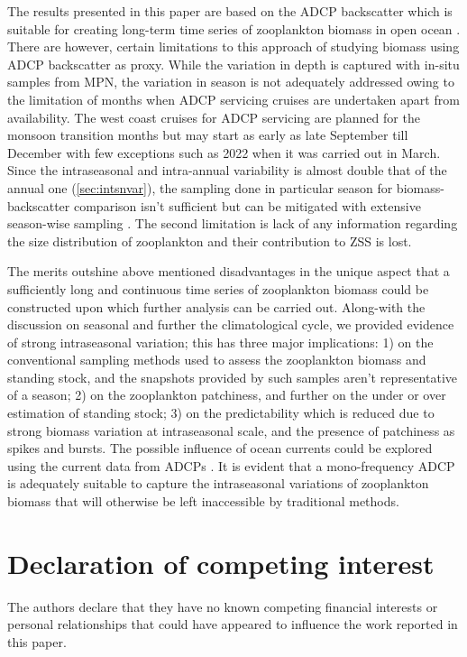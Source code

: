 \documentclass{article}
\begin{document}
	The results presented in this paper are based on the ADCP backscatter which is suitable for creating long-term time series of zooplankton biomass in open ocean \citep{jiang2007temporal,hobbs2021marine,ursella2021diel,aparna2022seasonal}. There are however, certain limitations to this approach of studying biomass using ADCP backscatter as proxy. While the variation in depth is captured with in-situ samples from MPN, the variation in season is not adequately addressed owing to the limitation of months when ADCP servicing cruises are undertaken apart from availability. The west coast cruises for ADCP servicing are planned for the monsoon transition months but may start as early as late September till December with few exceptions such as 2022 when it was carried out in March. Since the intraseasonal and intra-annual variability is almost double that of the annual one (\autoref{sec:intsnvar}), the sampling done in particular season for biomass-backscatter comparison isn't sufficient but can be mitigated with extensive season-wise sampling \citep{jadhav2024abundance}. The second limitation is lack of any information regarding the size distribution of zooplankton and their contribution to ZSS is lost. 
	
	The merits outshine above mentioned disadvantages in the unique aspect that a sufficiently long and continuous time series of zooplankton biomass could be constructed upon which further analysis can be carried out. Along-with the discussion on seasonal and further the climatological cycle, we provided evidence of strong intraseasonal variation; this has three major implications: 1) on the conventional sampling methods used to assess the zooplankton biomass and standing stock, and the snapshots provided by such samples aren't representative of a season; 2) on the zooplankton patchiness, and further on the under or over estimation of standing stock; 3) on the predictability which is reduced due to strong biomass variation at intraseasonal scale, and the presence of patchiness as spikes and bursts. The possible influence of ocean currents could be explored using the current data from ADCPs \citep{hitchcock2002zooplankton,lawson2004acoustically}. It is evident that a mono-frequency ADCP is adequately suitable to capture the intraseasonal variations of  zooplankton biomass that will otherwise be left inaccessible by traditional methods. 
	
	\section{Declaration of competing interest}
	The authors declare that they have no known competing financial interests or personal
	relationships that could have appeared to influence the work reported in this paper.
	
\end{document}
